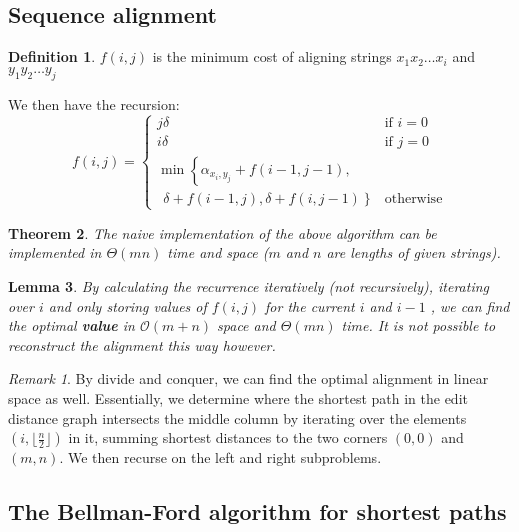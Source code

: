 \documentclass[10pt, oneside, reqno]{amsart}
\theoremstyle{plain}%
\newtheorem{thm}{Theorem}[section]
\newtheorem{lem}[thm]{Lemma}
\theoremstyle{definition}
\newtheorem{defn}[thm]{Definition}
\theoremstyle{remark}
\newtheorem*{rem}{Remark}
\newcommand{\bigo}[1]{\mathcal{O}(#1)}
\begin{document}
\subsection{Sequence alignment} %
\label{sub:sequence_alignment}

\begin{defn}
	$f(i,j)$ is the minimum cost of aligning strings $x_1 x_2\dots x_i$ and $y_1 y_2 \dots y_j$
\end{defn}

We then have the recursion:
\[
	f(i,j) = \begin{cases}
		j \delta 		&\text{if $i = 0$}\\
		i \delta 		&\text{if $j = 0$}\\
		\min \left\{ \alpha_{x_i,y_j} + f(i-1,j-1), \right. & \\
		\ \ \left. \delta + f(i-1,j), \delta + f(i,j-1) \right\} &\text{otherwise} %
	\end{cases}
\]

\begin{thm}
	The naive implementation of the above algorithm can be implemented in $\Theta(mn)$ time and space  ($m$ and $n$ are lengths of given strings).
\end{thm}

\begin{lem}
	By calculating the recurrence iteratively (not recursively), iterating over $i$ and only storing values of $f(i, j)$ for the current $i$ and $i-1$ , we can find the optimal \textbf{value} in $\bigo{m+n}$ space and $\Theta(m n)$ time. It is not possible to reconstruct the alignment this way however.
\end{lem}

\begin{rem}
	By divide and conquer, we can find the optimal alignment in linear space as well. Essentially, we determine where the shortest path in the edit distance graph intersects the middle column by iterating over the elements $(i, \lfloor \frac{n}{2} \rfloor)$ in it, summing shortest distances to the two corners $(0, 0)$ and $(m, n)$. We then recurse on the left and right subproblems.
\end{rem}

\subsection{The Bellman-Ford algorithm for shortest paths} %
\label{sub:the_bellman_ford_algorithm_for_shortest_paths}
\end{document}
